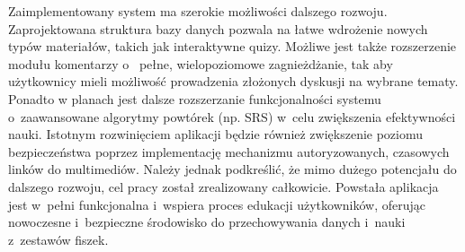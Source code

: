 Zaimplementowany system ma szerokie możliwości dalszego rozwoju. Zaprojektowana struktura bazy danych pozwala na łatwe 
wdrożenie nowych typów materiałów, takich jak interaktywne quizy. Możliwe jest także rozszerzenie modułu komentarzy o~
pełne, wielopoziomowe zagnieżdżanie, tak aby użytkownicy mieli możliwość prowadzenia złożonych dyskusji na wybrane tematy. Ponadto 
w planach jest dalsze rozszerzanie funkcjonalności systemu o~zaawansowane algorytmy powtórek (np. SRS) w~celu zwiększenia efektywności nauki. 
Istotnym rozwinięciem aplikacji będzie również zwiększenie poziomu bezpieczeństwa poprzez implementację mechanizmu autoryzowanych, 
czasowych linków do multimediów. Należy jednak podkreślić, że mimo dużego potencjału do dalszego rozwoju, cel pracy został zrealizowany całkowicie. 
Powstała aplikacja jest w~pełni funkcjonalna i~wspiera proces edukacji użytkowników, oferując nowoczesne i~bezpieczne środowisko 
do przechowywania danych i~nauki z~zestawów fiszek.